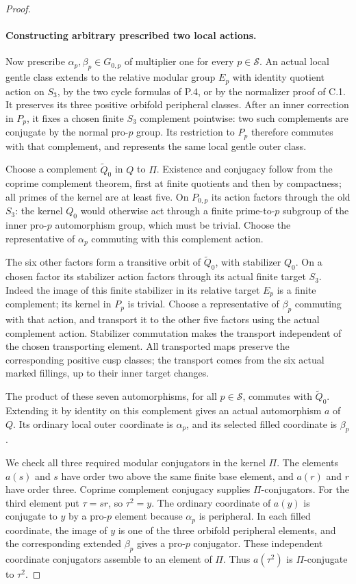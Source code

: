 \begin{proof}
\paragraph{Constructing arbitrary prescribed two local actions.}
Now prescribe $\alpha_p,\beta_p\in G_{0,p}$ of
multiplier one for every $p\in\mathcal S$.
An actual local gentle class extends to the relative
modular group $E_p$ with identity quotient action on
$S_3$, by the two cycle formulas of P.4, or by the
normalizer proof of C.1. It preserves its three
positive orbifold peripheral classes. After an
inner correction in $P_p$, it fixes a chosen finite
$S_3$ complement pointwise: two such complements
are conjugate by the normal pro-$p$ group. Its
restriction to $P_p$ therefore commutes with that
complement, and represents the same local gentle
outer class.

Choose a complement $\widetilde Q_0$ in $Q$ to
$\Pi$. Existence and conjugacy follow from the
coprime complement theorem, first at finite
quotients and then by compactness; all primes of
the kernel are at least five. On $P_{0,p}$ its
action factors through the old $S_3$: the kernel
$Q_0$ would otherwise act through a finite
prime-to-$p$ subgroup of the inner pro-$p$
automorphism group, which must be trivial.
Choose the representative of $\alpha_p$ commuting
with this complement action.

The six other factors form a transitive orbit of
$\widetilde Q_0$, with stabilizer $Q_0$. On a
chosen factor its stabilizer action factors through
its actual finite target $S_3$. Indeed the image
of this finite stabilizer in its relative target
$E_p$ is a finite complement; its kernel in $P_p$
is trivial. Choose a representative of $\beta_p$
commuting with that action, and transport it to
the other five factors using the actual complement
action. Stabilizer commutation makes the transport
independent of the chosen transporting element.
All transported maps preserve the corresponding
positive cusp classes; the transport comes from
the six actual marked fillings, up to their inner
target changes.

The product of these seven automorphisms, for all
$p\in\mathcal S$, commutes with $\widetilde Q_0$.
Extending it by identity on this complement gives
an actual automorphism $a$ of $Q$. Its ordinary
local outer coordinate is $\alpha_p$, and its
selected filled coordinate is $\beta_p$.

We check all three required modular conjugators
in the kernel $\Pi$. The elements $a(s)$ and $s$
have order two above the same finite base element,
and $a(r)$ and $r$ have order three. Coprime
complement conjugacy supplies $\Pi$-conjugators.
For the third element put $\tau=sr$, so
$\tau^2=y$. The ordinary coordinate of $a(y)$ is
conjugate to $y$ by a pro-$p$ element because
$\alpha_p$ is peripheral. In each filled coordinate,
the image of $y$ is one of the three orbifold
peripheral elements, and the corresponding extended
$\beta_p$ gives a pro-$p$ conjugator. These independent
coordinate conjugators assemble to an element of
$\Pi$. Thus $a(\tau^2)$ is $\Pi$-conjugate to
$\tau^2$.


\end{proof}
